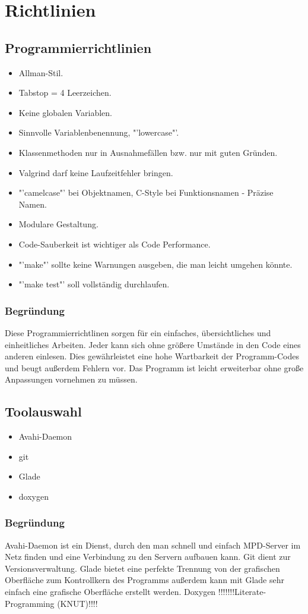 \chapter{Richtlinien}
\section{Programmierrichtlinien}
\renewcommand{\labelitemi}{•}
\begin{itemize}
\item Allman-Stil.
\item Tabstop = 4 Leerzeichen.
\item Keine globalen Variablen.
\item Sinnvolle Variablenbenennung, "'lowercase"'.
\item Klassenmethoden nur in Ausnahmefällen bzw. nur mit guten Gründen.
\item Valgrind darf keine Laufzeitfehler bringen.
\item "'camelcase"' bei Objektnamen, C-Style bei Funktionsnamen - Präzise Namen.
\item Modulare Gestaltung.
\item Code-Sauberkeit ist wichtiger als Code Performance.
\item "'make"' sollte keine Warnungen ausgeben, die man leicht umgehen könnte.
\item "'make test"' soll vollständig durchlaufen.
\end{itemize}
\subsection{Begründung}
Diese Programmierrichtlinen sorgen für ein einfaches, übersichtliches und einheitliches Arbeiten.
Jeder kann sich ohne größere Umstände in den Code eines anderen einlesen. Dies gewährleistet eine
hohe Wartbarkeit der Programm-Codes und beugt außerdem Fehlern vor. Das Programm ist leicht
erweiterbar ohne große Anpassungen vornehmen zu müssen.
\section{Toolauswahl}
\begin{itemize}
\item Avahi-Daemon
\item git
\item Glade
\item doxygen
\end{itemize}
\subsection{Begründung}
Avahi-Daemon ist ein Dienst, durch den man schnell und einfach MPD-Server im Netz finden und eine
Verbindung zu den Servern aufbauen kann. Git dient zur Versionsverwaltung. Glade bietet eine perfekte
Trennung von der grafischen Oberfläche zum Kontrollkern des Programms außerdem kann mit Glade sehr
einfach eine grafische Oberfläche erstellt werden. Doxygen !!!!!!!Literate-Programming (KNUT)!!!!
